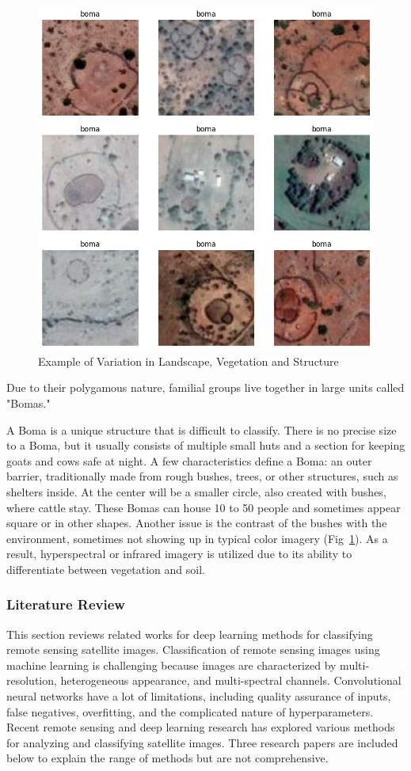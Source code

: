 \documentclass[10pt]{article}
\begin{document}
\begin{figure} [H]
    \centering
    \includegraphics[width=0.8\linewidth]{images/types of bomas.png}
    \caption{Example of Variation in Landscape, Vegetation and Structure}
    \label{fig:types_of_bomas}
\end{figure}

Due to their polygamous nature, familial groups live together in large units called "Bomas." 

A Boma is a unique structure that is difficult to classify. There is no precise size to a Boma, but it usually consists of multiple small huts and a section for keeping goats and cows safe at night. A few characteristics define a Boma: an outer barrier, traditionally made from rough bushes, trees, or other structures, such as shelters inside. At the center will be a smaller circle, also created with bushes, where cattle stay. These Bomas can house 10 to 50 people and sometimes appear square or in other shapes. Another issue is the contrast of the bushes with the environment, sometimes not showing up in typical color imagery (Fig~\ref{fig:types_of_bomas}). As a result, hyperspectral or infrared imagery is utilized due to its ability to differentiate between vegetation and soil.



\subsubsection{Literature Review}

This section reviews related works for deep learning methods for classifying remote sensing satellite images. Classification of remote sensing images using machine learning is challenging because images are characterized by multi-resolution, heterogeneous appearance, and multi-spectral channels. Convolutional neural networks have a lot of limitations, including quality assurance of inputs, false negatives, overfitting, and the complicated nature of hyperparameters. Recent remote sensing and deep learning research has explored various methods for analyzing and classifying satellite images. Three research papers are included below to explain the range of methods but are not comprehensive.
\end{document}
